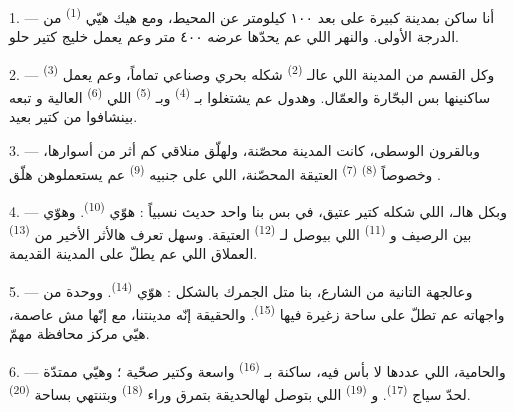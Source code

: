\VUsaut{2.0mm}
\VUsaut{3.0mm}
\VUfilet{16mm}
\VUsaut{5.6mm}
\VUsaut{1.4mm}
\VUsaut{2.2mm}

\VUsaut{3.0mm}

1. --- أنا ساكن بمدينة كبيرة على بعد ١٠٠ كيلومتر عن المحيط، ومع هيك
هيّي  \textsuperscript{(1)} من الدرجة الأولى. والنهر اللي عم
يحدّها عرضه ٤٠٠ متر وعم يعمل خليج كتير حلو.

2. --- وكل القسم من المدينة اللي عالـ \textsuperscript{(2)}
شكله بحري وصناعي تماماً، وعم يعمل  \textsuperscript{(3)}
ساكنينها بس البحّارة والعمّال. وهدول عم يشتغلوا بـ
\textsuperscript{(4)} وبـ \textsuperscript{(5)} اللي
 \textsuperscript{(6)} العالية و تبعه
بينشافوا من كتير بعيد.

3. --- وبالقرون الوسطى، كانت المدينة محصّنة، ولهلّق منلاقي كم أثر من
أسوارها، وخصوصاً  \textsuperscript{(8)} 
\textsuperscript{(7)} العتيقة المحصّنة، اللي على جنبيه 
\textsuperscript{(9)} عم يستعملوهن هلّق .

4. --- وبكل هالـ، اللي شكله كتير عتيق، في بس بنا واحد
حديث نسبياً : هوّي  \textsuperscript{(10)}. وهوّي بين
الرصيف و \textsuperscript{(11)} اللي بيوصل لـ \textsuperscript{(12)} العتيقة. وسهل تعرف هالأثر الأخير من
 \textsuperscript{(13)} العملاق اللي عم يطلّ على
المدينة القديمة.

5. --- وعالجهة التانية من الشارع،  بنا متل الجمرك
بالشكل : هوّي  \textsuperscript{(14)}. ووحدة من
واجهاته عم تطلّ على ساحة زغيرة فيها 
\textsuperscript{(15)}. والحقيقة إنّه مدينتنا، مع إنّها مش عاصمة، هيّي
مركز محافظة مهمّ.

\VUsaut{5.0mm}
\VUsaut{3.4mm}

6. --- والحامية، اللي عددها لا بأس فيه، ساكنة بـ
\textsuperscript{(16)} واسعة وكتير صحّية ؛ وهيّي ممتدّة لحدّ سياج
 \textsuperscript{(17)}. و
\textsuperscript{(19)} اللي بتوصل لهالحديقة بتمرق وراء  \textsuperscript{(18)} وبتنتهي بساحة 
\textsuperscript{(20)}.

